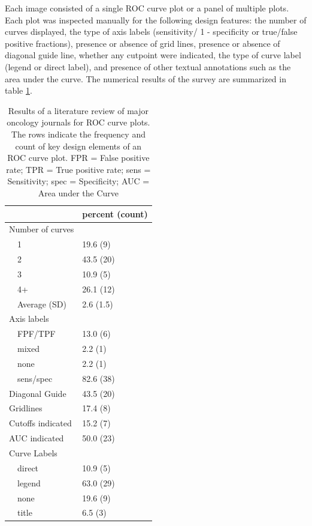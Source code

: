 \documentclass[article]{jss}
\begin{document}
Each image consisted of a single ROC curve plot or a panel of multiple
plots. Each plot was inspected manually for the following design
features: the number of curves displayed, the type of axis labels
(sensitivity/ 1 - specificity or true/false positive fractions),
presence or absence of grid lines, presence or absence of diagonal guide
line, whether any cutpoint were indicated, the type of curve label
(legend or direct label), and presence of other textual annotations such
as the area under the curve. The numerical results of the survey are
summarized in table \ref{table1}.

\begin{table}[ht]
\centering
\begin{tabular}{ll}
  \hline
 & percent (count) \\ 
  \hline
Number of curves &  \\ 
  $\quad$1 & 19.6 (9) \\ 
  $\quad$2 & 43.5 (20) \\ 
  $\quad$3 & 10.9 (5) \\ 
  $\quad$4+ & 26.1 (12) \\ 
  $\quad$Average (SD) & 2.6 (1.5) \\ 
  Axis labels &  \\ 
  $\quad$FPF/TPF & 13.0 (6) \\ 
  $\quad$mixed & 2.2 (1) \\ 
  $\quad$none & 2.2 (1) \\ 
  $\quad$sens/spec & 82.6 (38) \\ 
  Diagonal Guide & 43.5 (20) \\ 
  Gridlines & 17.4 (8) \\ 
  Cutoffs indicated & 15.2 (7) \\ 
  AUC indicated & 50.0 (23) \\ 
  Curve Labels &  \\ 
  $\quad$direct & 10.9 (5) \\ 
  $\quad$legend & 63.0 (29) \\ 
  $\quad$none & 19.6 (9) \\ 
  $\quad$title & 6.5 (3) \\ 
   \hline
\end{tabular}
\caption{Results of a literature review of major oncology journals for ROC curve plots. The rows indicate the frequency and count of key design elements of an ROC curve plot. FPR = False positive rate; TPR = True positive rate; sens = Sensitivity; spec = Specificity; AUC = Area under the Curve} 
\label{table1}
\end{table}
\end{document}
